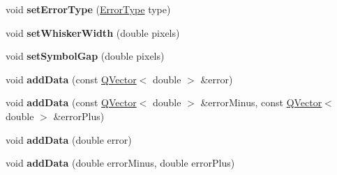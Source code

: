 \begin{DoxyCompactItemize}
\item 
void {\bfseries set\+Error\+Type} (\hyperlink{class_q_c_p_error_bars_a95f0220f11a72648b96480a85ce26474}{Error\+Type} type)\hypertarget{class_q_c_p_error_bars_af0af493d454a8f3a0908830160680d2b}{}\label{class_q_c_p_error_bars_af0af493d454a8f3a0908830160680d2b}

\item 
void {\bfseries set\+Whisker\+Width} (double pixels)\hypertarget{class_q_c_p_error_bars_ad05f6ff9e46c6047f1cd2459744b7b59}{}\label{class_q_c_p_error_bars_ad05f6ff9e46c6047f1cd2459744b7b59}

\item 
void {\bfseries set\+Symbol\+Gap} (double pixels)\hypertarget{class_q_c_p_error_bars_a280ee8d863d8a2630c309701d019b3de}{}\label{class_q_c_p_error_bars_a280ee8d863d8a2630c309701d019b3de}

\item 
void {\bfseries add\+Data} (const \hyperlink{class_q_vector}{Q\+Vector}$<$ double $>$ \&error)\hypertarget{class_q_c_p_error_bars_aae296ad9817b3fa418db284af81cecf8}{}\label{class_q_c_p_error_bars_aae296ad9817b3fa418db284af81cecf8}

\item 
void {\bfseries add\+Data} (const \hyperlink{class_q_vector}{Q\+Vector}$<$ double $>$ \&error\+Minus, const \hyperlink{class_q_vector}{Q\+Vector}$<$ double $>$ \&error\+Plus)\hypertarget{class_q_c_p_error_bars_a2135cf41d7925a3dcdadd4eb03fd3eb6}{}\label{class_q_c_p_error_bars_a2135cf41d7925a3dcdadd4eb03fd3eb6}

\item 
void {\bfseries add\+Data} (double error)\hypertarget{class_q_c_p_error_bars_a39ef73b0e61941fc4064fd3a5224c72a}{}\label{class_q_c_p_error_bars_a39ef73b0e61941fc4064fd3a5224c72a}

\item 
void {\bfseries add\+Data} (double error\+Minus, double error\+Plus)\hypertarget{class_q_c_p_error_bars_a1833c5de9c2fe2952b977505d9f27cd1}{}\label{class_q_c_p_error_bars_a1833c5de9c2fe2952b977505d9f27cd1}


\end{DoxyCompactItemize}
